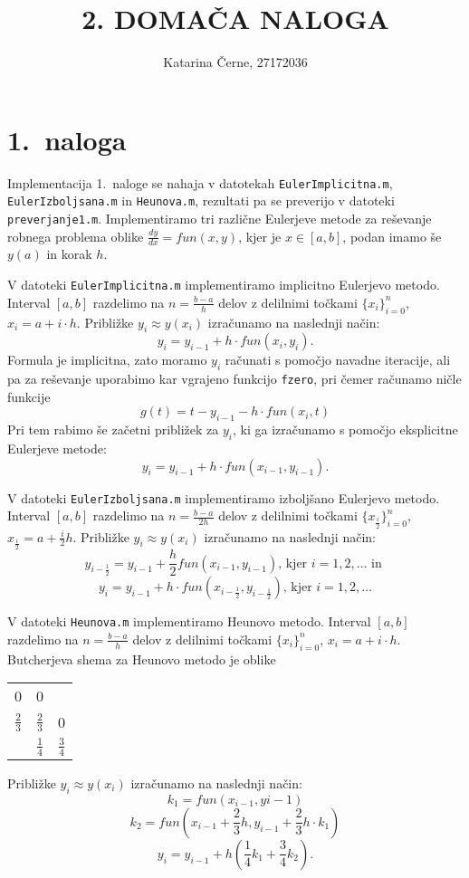 \documentclass[a4paper,12pt]{article}
\begin{document}
\title{2. DOMAČA NALOGA}
\author{Katarina Černe, 27172036}
\maketitle

\section*{1.\ naloga}

Implementacija 1.\ naloge se nahaja v datotekah \texttt{EulerImplicitna.m}, \texttt{EulerIzboljsana.m} in \texttt{Heunova.m}, rezultati pa se preverijo v datoteki \texttt{preverjanje1.m}.
Implementiramo tri različne Eulerjeve metode za reševanje robnega problema oblike 
\(\frac{dy}{dx}=fun(x,y)\), kjer je \(x\in [a,b]\), podan imamo še \(y(a)\) in korak \(h\).

V datoteki \texttt{EulerImplicitna.m} implementiramo implicitno Eulerjevo metodo.
Interval \([a,b]\) razdelimo na \(n=\frac{b-a}{h}\) delov z delilnimi
točkami \(\{x_i\}_{i=0}^{n}\), \(x_i=a+i\cdot h\). Približke \(y_i\approx y(x_i)\)
izračunamo na naslednji način: 
\[y_i=y_{i-1}+h\cdot fun(x_i,y_i).\]
Formula je implicitna, zato moramo $y_i$ računati s pomočjo navadne
iteracije, ali pa za reševanje uporabimo kar vgrajeno funkcijo \texttt{fzero},
pri čemer računamo ničle funkcije 
$$g(t)=t-y_{i-1}-h\cdot fun(x_i,t)$$
Pri tem rabimo še začetni približek za $y_i$, ki ga
izračunamo s pomočjo eksplicitne Eulerjeve metode:
$$y_i=y_{i-1}+h\cdot fun(x_{i-1},y_{i-1}).$$

V datoteki \texttt{EulerIzboljsana.m} implementiramo izboljšano
Eulerjevo metodo. Interval $[a,b]$ razdelimo na $n=\frac{b-a}{2h}$
delov z delilnimi točkami $\{x_{\frac{i}{2}}\}_{i=0}^n$,
$x_{\frac{i}{2}}=a+\frac{i}{2}h$.  Približke \(y_i\approx y(x_i)\)
izračunamo na naslednji način:
$$y_{i-\frac{1}{2}}=y_{i-1}+\frac{h}{2}fun(x_{i-1},y_{i-1})\textrm{, kjer }
i=1,2,\ldots \textrm{ in }$$
$$y_i = y_{i-1} + h \cdot fun(x_{i-\frac{1}{2}},y_{i-\frac{1}{2}})\textrm{, kjer }
i=1,2,\ldots$$

V datoteki \texttt{Heunova.m} implementiramo Heunovo metodo.
Interval \([a,b]\) razdelimo na \(n=\frac{b-a}{h}\) delov z delilnimi
točkami \(\{x_i\}_{i=0}^{n}\), \(x_i=a+i\cdot h\).
Butcherjeva shema za Heunovo metodo je oblike
\begin{center}
\begin{tabular}{c|cc}
0 & 0 &  \\
$\frac{2}{3}$ & $\frac{2}{3}$ & 0 \\ \hline
& $\frac{1}{4}$ & $\frac{3}{4}$ 
\end{tabular}
\end{center} 
Približke \(y_i\approx y(x_i)\) izračunamo na naslednji način:
$$k_1=fun(x_{i-1},y{i-1})$$
$$k_2=fun(x_{i-1}+\frac{2}{3}h,y_{i-1}+\frac{2}{3}h\cdot k_1)$$
$$y_i=y_{i-1}+h(\frac{1}{4}k_1+\frac{3}{4}k_2).$$
\end{document}
